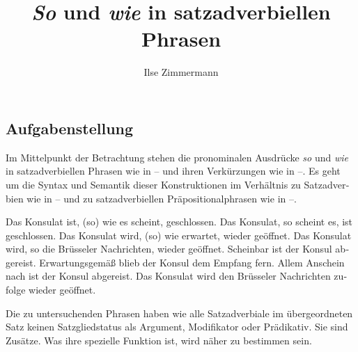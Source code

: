\documentclass[output=paper, colorlinks, citecolor=brown, booklanguage=german]{langscibook}
\author{Ilse Zimmermann\affiliation{Zentrum für Allgemeine Sprachwissenschaft (ZAS), Berlin}}
\title{\textit{So} und \textit{wie} in satzadverbiellen Phrasen}
\begin{document}
\begin{otherlanguage}{german}
\maketitle



\section{Aufgabenstellung} \label{sec:zi97:1}

Im Mittelpunkt der Betrachtung stehen die pronominalen Ausdrücke \textit{so} und \textit{wie} in satzadverbiellen Phrasen wie in -- und ihren Verkürzungen wie in --. Es geht um die Syntax und Semantik dieser Konstruktionen im Verhältnis zu Satzadverbien wie in -- und zu satzadverbiellen Präpositionalphrasen wie in --.

\ea \label{ex:zi97:1} Das Konsulat ist, (so) wie es scheint, geschlossen.
\ex \label{ex:zi97:2} Das Konsulat, so scheint es, ist geschlossen.
\ex \label{ex:zi97:3} Das Konsulat wird, (so) wie erwartet, wieder geöffnet.
\ex \label{ex:zi97:4} Das Konsulat wird, so die Brüsseler Nachrichten, wieder geöffnet. 
\ex \label{ex:zi97:5} Scheinbar ist der Konsul abgereist.
\ex \label{ex:zi97:6} Erwartungsgemäß blieb der Konsul dem Empfang fern.
\ex \label{ex:zi97:7} Allem Anschein nach ist der Konsul abgereist.
\ex \label{ex:zi97:8} Das Konsulat wird den Brüsseler Nachrichten zufolge wieder geöffnet.
\z

\noindent Die zu untersuchenden Phrasen haben wie alle Satzadverbiale im übergeordneten Satz keinen Satzgliedstatus als Argument, Modifikator oder Prädikativ. Sie sind Zusätze. Was ihre spezielle Funktion ist, wird näher zu bestimmen sein.


\end{otherlanguage}
\end{document}
